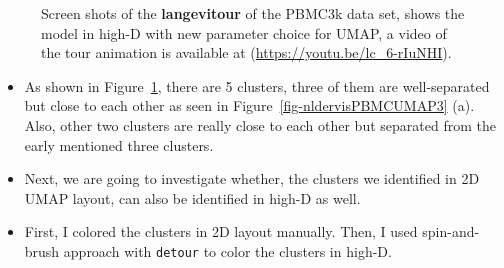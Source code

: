 \documentclass[
  12pt]{article}
\begin{document}
\begin{figure}[H]
\begin{minipage}[t]{0.33\linewidth}
{{}

}

\subcaption{\label{fig-pbmc2_sc2}}
\end{minipage}%
%
\begin{minipage}[t]{0.33\linewidth}

{\centering 


}

\subcaption{\label{fig-pbmc2_sc3}}
\end{minipage}%

\caption{\label{fig-pbmc2_sc}Screen shots of the \textbf{langevitour} of
the PBMC3k data set, shows the model in high-D with new parameter choice
for UMAP, a video of the tour animation is available at
(\url{https://youtu.be/lc_6-rIuNHI}).}

\end{figure}

\begin{itemize}
\item
  As shown in Figure~\ref{fig-pbmc2_sc}, there are 5 clusters, three of
  them are well-separated but close to each other as seen in
  Figure~\ref{fig-nldervisPBMCUMAP3} (a). Also, other two clusters are
  really close to each other but separated from the early mentioned
  three clusters.
\item
  Next, we are going to investigate whether, the clusters we identified
  in 2D UMAP layout, can also be identified in high-D as well.
\item
  First, I colored the clusters in 2D layout manually. Then, I used
  spin-and-brush approach with \texttt{detour} to color the clusters in
  high-D.
\end{itemize}
\end{document}
